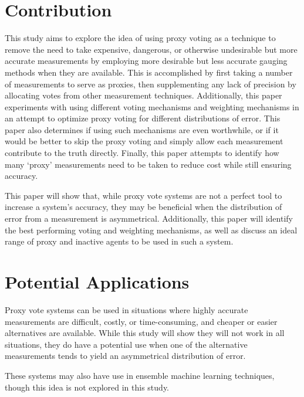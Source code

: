

\section{Contribution}\label{sec:contribution}
This study aims to explore the idea of using proxy voting as a technique to remove the
need to take expensive, dangerous, or otherwise undesirable but more accurate
measurements by employing more desirable but less accurate gauging methods when they
are available.
This is accomplished by first taking a number of measurements to serve as proxies, then
supplementing any lack of precision by allocating votes from other measurement
techniques.
Additionally, this paper experiments with using different voting mechanisms and
weighting mechanisms in an attempt to optimize proxy voting for different
distributions of error.
This paper also determines if using such mechanisms are even worthwhile, or if it
would be better to skip the proxy voting and simply allow each measurement contribute
to the truth directly.
Finally, this paper attempts to identify how many `proxy' measurements need
to be taken to reduce cost while still ensuring accuracy.

This paper will show that, while proxy vote systems are not a perfect tool to
increase a system's accuracy, they may be beneficial when the distribution of error
from a measurement is asymmetrical.
Additionally, this paper will identify the best performing voting and weighting
mechanisms, as well as discuss an ideal range of proxy and inactive agents to be used
in such a system.


\section{Potential Applications}\label{sec:potential-applications}
Proxy vote systems can be used in situations where highly accurate measurements are
difficult, costly, or time-consuming, and cheaper or easier alternatives are available.
While this study will show they will not work in all situations, they do have a
potential use when one of the alternative measurements tends to yield an asymmetrical
distribution of error.

These systems may also have use in ensemble machine learning techniques, though this
idea is not explored in this study.
